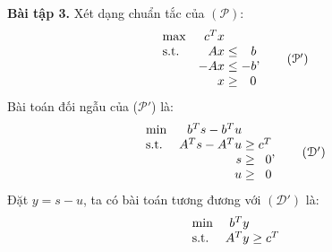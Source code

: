 \textbf{Bài tập 3.}
Xét dạng chuẩn tắc của  $(\mathcal{P})$:
\begin{equation*}
    \begin{array}{lr@{}c@{}r@{}l}
        \text{max} &c^{T}x\\
        \text{s.t.} & Ax{} & {}\leq{} & b\\
        & -Ax{} & {}\leq{} & -b\\
        & x{} & {}\geq{} & {}0
    \end{array},
\tag{$\mathcal{P}'$}
\end{equation*}
Bài toán đối ngẫu của  ($\mathcal{P}'$) là:
\begin{equation*}
    \begin{array}{lr@{}c@{}r@{}l}
        \text{min} &b^{T}s - b^{T}u\\
        \text{s.t.} & A^{T}s{} -A^{T}u{}& {}\geq{} & c^{T}\\
        & s{} & {}\geq{} & {}0\\
        & u{} & {}\geq{} & {}0
    \end{array},
    \tag {$\mathcal{D}'$}
\end{equation*}
Đặt $y=s-u$, ta có bài toán tương đương với {$(\mathcal{D}')$} là:
\begin{equation*}
    \begin{array}
        {lr@{}c@{}r@{}l}
        \text{min} &b^{T}y\\
        \text{s.t.} & A^{T}y{} & {}\geq{} & c^{T}\\
    \end{array}
\end{equation*}